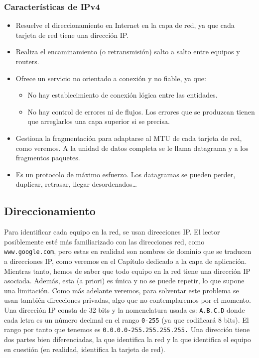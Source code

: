 \subsubsection{Características de \acrshort{IPv4}}
\begin{itemize}
    \item Resuelve el direccionamiento en Internet en la capa de red, ya que cada tarjeta de red tiene una dirección IP\@.
    \item Realiza el encaminamiento (o retransmisión) salto a salto entre equipos y routers.
    \item Ofrece un servicio no orientado a conexión y no fiable, ya que:
    \begin{itemize}
        \item No hay establecimiento de conexión lógica entre las entidades.
        \item No hay control de errores ni de flujos. Los errores que se produzcan tienen que arreglarlos una capa superior si se precisa.
    \end{itemize}
    \item Gestiona la fragmentación para adaptarse al \acrshort{MTU} de cada tarjeta de red, como veremos. A la unidad de datos completa se le llama datagrama y a los fragmentos paquetes. 
    \item Es un protocolo de máximo esfuerzo. Los datagramas se pueden perder, duplicar, retrasar, llegar desordenados\ldots
\end{itemize}

\subsection{Direccionamiento}

Para identificar cada equipo en la red, se usan direcciones IP\@. El lector posiblemente esté más familiarizado con las direcciones red, como \verb|www.google.com|, pero estas en realidad son nombres de dominio que se traducen a direcciones IP\@, como veremos en el Capítulo dedicado a la capa de aplicación. Mientras tanto, hemos de saber que todo equipo en la red tiene una dirección IP asociada. Además, esta (a priori) es única y no se puede repetir, lo que supone una limitación. Como más adelante veremos, para solventar este problema se usan también direcciones privadas, algo que no contemplaremos por el momento.\\

Una dirección \acrshort{IP} consta de 32 bits y la nomenclatura usada es: \verb|A.B.C.D| donde cada letra es un número decimal en el rango \verb|0-255| (ya que codificará 8 bits). El rango por tanto que tenemos es \verb|0.0.0.0-255.255.255.255.| Una dirección tiene dos partes bien diferenciadas, la que identifica la red y la que identifica el equipo en cuestión (en realidad, identifica la tarjeta de red).\\


